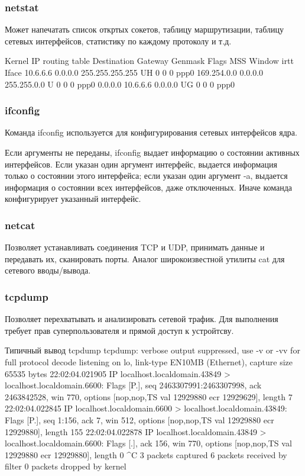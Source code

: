 \subsubsection{netstat}
Может напечатать список откртых сокетов, таблицу маршрутизации, таблицу сетевых интерфейсов, статистику по каждому протоколу и т.д.
\begin{plainlst}{}{}
Kernel IP routing table
Destination   Gateway    Genmask         Flags   MSS Window  irtt Iface
10.6.6.6      0.0.0.0    255.255.255.255 UH        0 0          0 ppp0
169.254.0.0   0.0.0.0    255.255.0.0     U         0 0          0 ppp0
0.0.0.0       10.6.6.6   0.0.0.0         UG        0 0          0 ppp0
\end{plainlst}

\subsubsection{ifconfig}
Команда ifconfig используется для конфигурирования сетевых интерфейсов ядра.

Если аргументы не переданы, ifconfig выдает информацию о состоянии активных интерфейсов. Если указан один аргумент интерфейс, выдается информация только о состоянии этого интерфейса; если указан один аргумент -a, выдается информация о состоянии всех интерфейсов, даже отключенных. Иначе команда конфигурирует указанный интерфейс.

\subsubsection{netcat}
Позволяет устанавливать соединения TCP и UDP, принимать данные и передавать их, сканировать порты. Аналог широкоизвестной утилиты cat для сетевого вводы/вывода.

\subsubsection{tcpdump}
Позволяет перехватывать и анализировать сетевой трафик. Для выполнения требует прав суперпользователя и прямой доступ к устройтсву.

\begin{plainlst}{Типичный вывод tcpdump}{}
tcpdump: verbose output suppressed, use -v or -vv for full protocol decode
listening on lo, link-type EN10MB (Ethernet), capture size 65535 bytes
22:02:04.021905 IP localhost.localdomain.43849 > localhost.localdomain.6600: Flags [P.], seq 2463307991:2463307998, ack 2463842528, win 770, options [nop,nop,TS val 12929880 ecr 12929629], length 7
22:02:04.022845 IP localhost.localdomain.6600 > localhost.localdomain.43849: Flags [P.], seq 1:156, ack 7, win 512, options [nop,nop,TS val 12929880 ecr 12929880], length 155
22:02:04.022878 IP localhost.localdomain.43849 > localhost.localdomain.6600: Flags [.], ack 156, win 770, options [nop,nop,TS val 12929880 ecr 12929880], length 0
^C
3 packets captured
6 packets received by filter
0 packets dropped by kernel
\end{plainlst}

